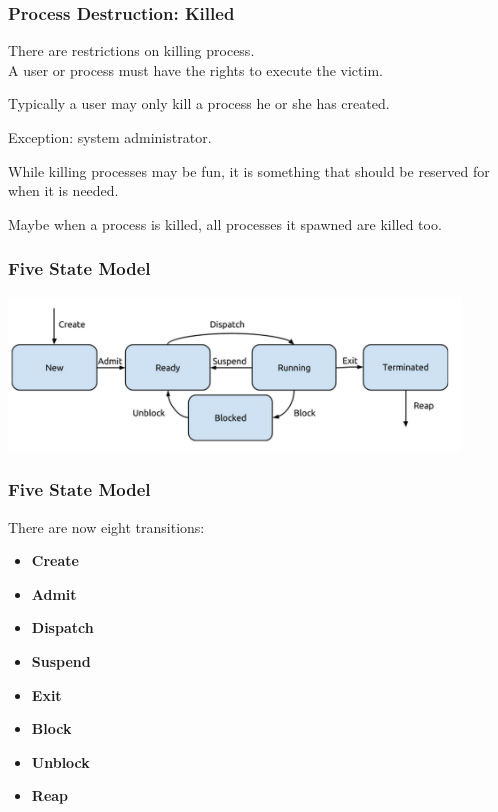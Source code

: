 \begin{frame}
	\frametitle{Process Destruction: Killed}

	There are restrictions on killing process.\\
	\quad A user or process must have the rights to execute the victim.

	Typically a user may only kill a process he or she has created.

	Exception: system administrator.

	While killing processes may be fun, it is something that should be reserved for when it is needed.

	Maybe when a process is killed, all processes it spawned are killed too.


\end{frame}

\begin{frame}
	\frametitle{Five State Model}

	\begin{center}
		\includegraphics[width=0.9\textwidth]{images/5-state-model.png}
	\end{center}

\end{frame}

\begin{frame}
	\frametitle{Five State Model}

	There are now eight transitions:

	\begin{itemize}
		\item \textbf{Create}
		\item \textbf{Admit}
		\item \textbf{Dispatch}
		\item \textbf{Suspend}
		\item \textbf{Exit}
		\item \textbf{Block}
		\item \textbf{Unblock}
		\item \textbf{Reap}
	\end{itemize}

\end{frame}

